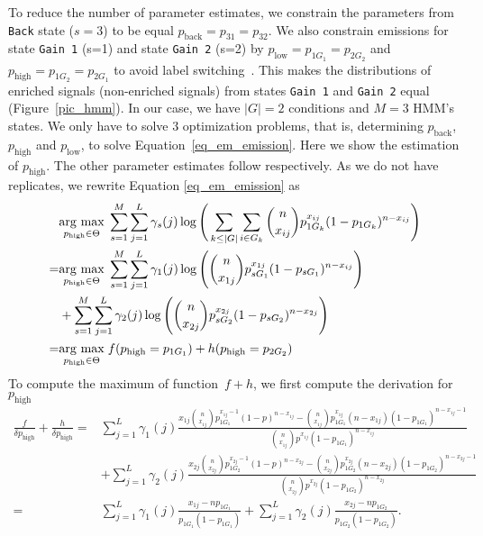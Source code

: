 \noindent
To reduce the number of parameter estimates, we constrain the parameters from {\tt Back} state ($s=3$) to be equal $p_{\text{back}}=p_{31}=p_{32}$. 
We also constrain emissions for state {\tt Gain 1} (s=1) and state {\tt Gain 2} (s=2) by $p_{\text{low}}=p_{1G_1}=p_{2G_2}$ and $p_{\text{high}}=p_{1G_2}=p_{2G_1}$ to avoid label switching~\citep{rabiner1989}.
This makes the distributions of enriched signals (non-enriched signals) from states {\tt Gain 1} and {\tt Gain 2} equal (Figure~\ref{pic_hmm}). 
In our case, we have $|G|=2$ conditions and $M=3$ HMM's states.
We only have to solve $3$ optimization problems, that is, determining $p_{\text{back}}$, $p_{\text{high}}$ and $p_{\text{low}}$, to solve Equation~\ref{eq_em_emission}.
Here we show the estimation of $p_{\text{high}}$.
The other parameter estimates follow respectively.
As we do not have replicates, we rewrite Equation \ref{eq_em_emission} as
\begin{align*}
 & \underset{p_{\text{high}} \in \Theta}{\operatorname{arg}\,\operatorname{max}}\;  \sum_{s=1}^M \sum_{j=1}^L \gamma_s(j) \log \Bigg( \sum_{k \leq |G|} \sum_{i \in G_k}  {n\choose x_{ij} }p_{1G_k}^{x_{ij}}(1-p_{1G_k})^{n-x_{ij}} \Bigg) \notag \\
 =& \underset{p_{\text{high}} \in \Theta}{\operatorname{arg}\,\operatorname{max}}\; \sum_{s=1}^M \sum_{j=1}^L \gamma_1(j) \log \Bigg( {n \choose x_{1j} }p_{sG_1}^{x_{1j}}(1-p_{sG_1})^{n-x_{ij}} \Bigg) \\ &+ \sum_{s=1}^M \sum_{j=1}^L \gamma_2(j) \log \Bigg( {n \choose x_{2j} }p_{sG_2}^{x_{2j}}(1-p_{sG_2})^{n-x_{2j}} \Bigg) \\
 =& \underset{p_{\text{high}} \in \Theta}{\operatorname{arg}\,\operatorname{max}}\; f(p_{\text{high}}=p_{1G_1}) + h(p_{\text{high}}=p_{2G_2})
\end{align*}
\noindent
To compute the maximum of function~$f+h$, we first compute the derivation for $p_{\text{high}}$
\begin{align*}
 \frac{f}{\delta p_{\text{high}}} + \frac{h}{\delta p_{\text{high}}} =& \sum_{j=1}^L \gamma_1(j) \frac{x_{1j} {n \choose x_{1j}} p_{1G_1}^{x_{1j}-1}(1-p)^{n-x_{1j}} - {n \choose x_{1j}} p_{1G_1}^{x_{1j}} (n - x_{1j}) (1-p_{1G_1})^{n-x_{1j}-1}}{{n \choose x_{1j}} p^{x_{1j}}(1-p_{1G_1})^{n-x_{ij}}}\\
 &+ \sum_{j=1}^L \gamma_2(j) \frac{x_{2j} {n \choose x_{2j}} p_{1G_2}^{x_{2j}-1}(1-p)^{n-x_{2j}} - {n \choose x_{2j}} p_{1G_2}^{x_{2j}} (n - x_{2j}) (1-p_{1G_2})^{n-x_{2j}-1}}{{n \choose x_{2j}} p^{x_{2j}}(1-p_{1G_2})^{n-x_{2j}}}\\
 =& \sum_{j=1}^L \gamma_1
(j) \frac{x_{1j} - np_{1G_1}}{p_{1G_1}(1- p_{1G_1})} + \sum_{j=1}^L \gamma_2(j) \frac{x_{2j} - np_{1G_2}}{p_{1G_2}(1- p_{1G_2})}.
\end{align*}

